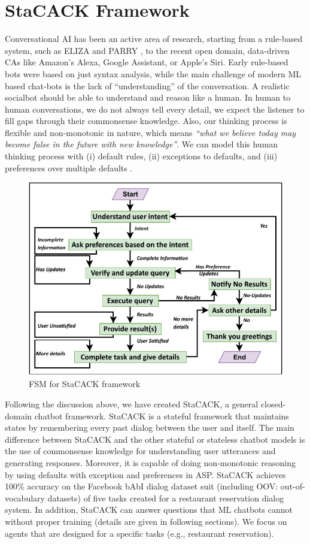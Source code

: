 \documentclass[letterpaper]{article}
\begin{document}
\section{StaCACK Framework}
Conversational AI has been an active area of research, starting from a rule-based system, such as ELIZA \cite{eliza} and PARRY \cite{parry}, to the recent open domain, data-driven CAs like Amazon's Alexa, Google Assistant, or Apple's Siri. Early rule-based bots were based on just syntax analysis, while the main challenge of modern ML based chat-bots is the lack of ``understanding'' of the conversation.
A realistic socialbot should be able to understand and reason like a human. In human to human conversations, we do not always tell every detail, we expect the listener to fill gaps through their commonsense knowledge. Also, our thinking process is flexible and non-monotonic in nature, which means \textit{``what we believe today may become false in the future with new knowledge''}. We can model this human thinking process with (i) default rules, (ii) exceptions to defaults, and (iii) preferences over multiple defaults \cite{asp}.

\begin{figure}[h]
\centering
\includegraphics[scale = 0.73]{FSM}
\caption{FSM for StaCACK framework}
\label{fig:FSM_StaCACK}
\end{figure}

Following the discussion above, we have created StaCACK, a general closed-domain chatbot framework. StaCACK is a stateful framework that maintains states by remembering every past dialog between the user and itself. The main difference between StaCACK and the other stateful or stateless chatbot models is the use of commonsense knowledge for understanding user utterances and generating responses. Moreover, it is capable of doing non-monotonic reasoning by using defaults with exception and preferences in ASP. StaCACK achieves 100\% accuracy on the Facebook bAbI dialog dataset suit \cite{babi_dialog} (including OOV: out-of-vocabulary datasets) of five tasks  created for a restaurant reservation dialog system. In addition, StaCACK can answer questions that ML chatbots cannot without proper training (details are given in following sections). We focus on agents that are designed for a specific tasks (e.g., restaurant reservation).
\end{document}
